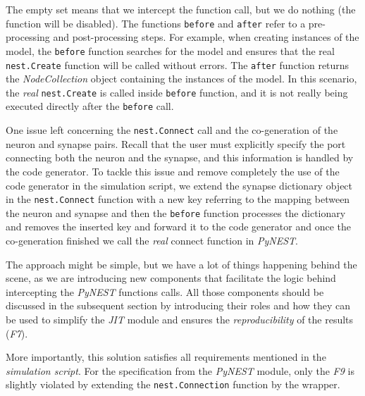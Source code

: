 The empty set means that we intercept the function call, but we do nothing (the function will be disabled). The functions \texttt{before} and \texttt{after} refer to a pre-processing and post-processing steps. For example, when creating instances of the model, the \texttt{before} function searches for the model and ensures that the real \texttt{nest.Create} function will be called without errors. The \texttt{after} function returns the \emph{NodeCollection} object containing the instances of the model. In this scenario, the \emph{real} \texttt{nest.Create} is called inside \texttt{before} function, and it is not really being executed directly after the \texttt{before} call. 

One issue left concerning the \texttt{nest.Connect} call and the co-generation of the neuron and synapse pairs. Recall that the user must explicitly specify the port connecting both the neuron and the synapse, and this information is handled by the code generator. To tackle this issue and remove completely the use of the code generator in the simulation script, we extend the synapse dictionary object in the \texttt{nest.Connect} function with a new key referring to the mapping between the neuron and synapse and then the \texttt{before} function processes the dictionary and removes the inserted key and forward it to the code generator and once the co-generation finished we call the \emph{real} connect function in \emph{PyNEST}.


The approach might be simple, but we have a lot of things happening behind the scene, as we are introducing new components that facilitate the logic behind intercepting the \emph{PyNEST} functions calls. All those components should be discussed in the subsequent section by introducing their roles and how they can be used to simplify the \emph{JIT} module and ensures the \emph{reproducibility} of the results (\emph{F7}).


More importantly, this solution satisfies all requirements mentioned in the \emph{simulation script}. For the specification from the \emph{PyNEST} module, only the \emph{F9} is slightly violated by extending the \texttt{nest.Connection} function by the wrapper.




